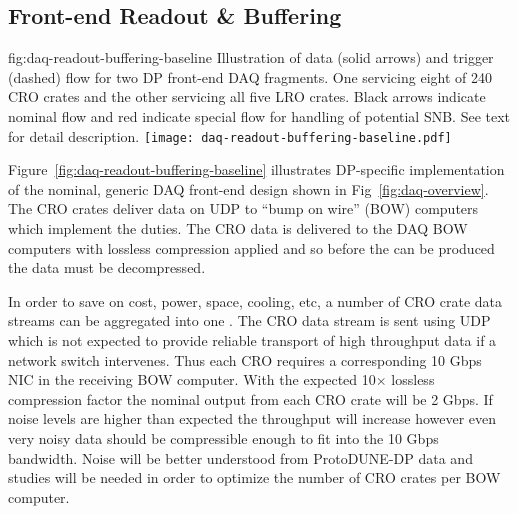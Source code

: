 \subsection{Front-end Readout \& Buffering}
\label{sec:fd-daq-fero}


\begin{dunefigure}{fig:daq-readout-buffering-baseline}
  {Illustration of data (solid arrows) and trigger (dashed) flow for
    two DP front-end DAQ fragments. 
    One servicing eight of 240 CRO crates and the other servicing all
    five LRO crates.  
    Black arrows indicate nominal flow and red indicate special flow
    for handling of potential SNB. 
    See text for detail description.}
  \texttt{[image: daq-readout-buffering-baseline.pdf]}%
\end{dunefigure}

Figure~\ref{fig:daq-readout-buffering-baseline} illustrates
DP-specific implementation of the nominal, generic DAQ front-end
 design shown in Fig~\ref{fig:daq-overview}. 
The CRO crates deliver data on UDP to ``bump on wire'' (BOW) computers
which implement the  duties.
The CRO data is delivered to the DAQ BOW computers with lossless
compression applied and so before the  can be
produced the data must be decompressed. 

In order to save on cost, power, space, cooling, etc, a number of CRO
crate data streams can be aggregated into one . 
The CRO data stream is sent using UDP which is not expected to provide
reliable transport of high throughput data if a network switch
intervenes. 
Thus each CRO requires a corresponding 10 Gbps NIC in the receiving
BOW computer.
With the expected 10$\times$ lossless compression factor the nominal
output from each CRO crate will be 2 Gbps. 
If noise levels are higher than expected the throughput will increase
however even very noisy data should be compressible enough to fit into
the 10 Gbps bandwidth. 
Noise will be better understood from ProtoDUNE-DP data and studies
will be needed in order to optimize the number of CRO crates per BOW
computer.

